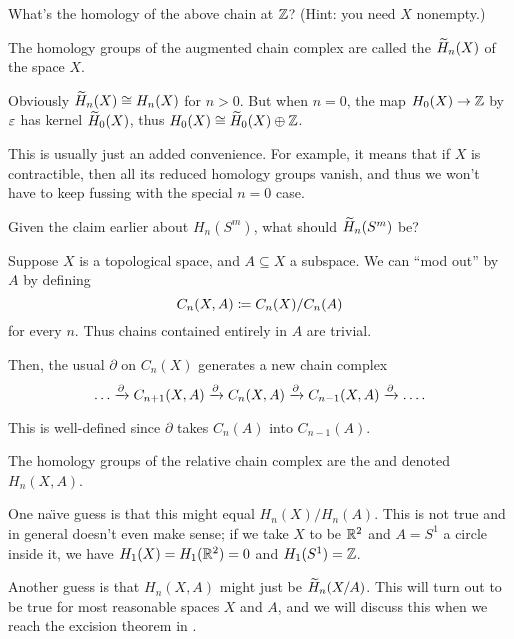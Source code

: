 \begin{ques}
	What's the homology of the above chain at $\mathbb Z$?
	(Hint: you need $X$ nonempty.)
\end{ques}
\begin{definition}
	\label{def:augment}
	The homology groups of the augmented chain complex are called the
	 $\widetilde H_n(X)$ of the space $X$.

	Obviously $\widetilde H_n(X) \cong H_n(X)$ for $n > 0$.
	But when $n=0$, the map $H_0(X) \to \mathbb Z$ by $\varepsilon$ has kernel $\widetilde H_0(X)$,
	thus $H_0(X) \cong \widetilde H_0(X) \oplus \mathbb Z$.
\end{definition}
This is usually just an added convenience.
For example, it means that if $X$ is contractible,
then all its reduced homology groups vanish,
and thus we won't have to keep fussing with the special $n=0$ case.
\begin{ques}
	Given the claim earlier about $H_n(S^m)$, what should $\widetilde H_n(S^m)$ be?
\end{ques}

\begin{example}
	Suppose $X$ is a topological space, and $A \subseteq X$ a subspace.
	We can ``mod out'' by $A$ by defining
	\[ C_n(X,A) \coloneqq C_n(X) / C_n(A) \]
	for every $n$. Thus chains contained entirely in $A$ are trivial.

	Then, the usual $\partial$ on $C_n(X)$ generates a new chain complex
	\[ \dots \xrightarrow{\partial} C_{n+1}(X,A) \xrightarrow{\partial} C_n(X,A)
	\xrightarrow{\partial} C_{n-1}(X,A) \xrightarrow{\partial} \dots. \]

	This is well-defined since $\partial$ takes $C_n(A)$ into $C_{n-1}(A)$.
\end{example}
\begin{definition}
	The homology groups of the relative chain complex are the
	 and denoted $H_n(X,A)$.
\end{definition}

One na\"{\i}ve guess is that this might equal $H_n(X) / H_n(A)$.
This is not true and in general doesn't even make sense;
if we take $X$ to be $\mathbb R^2$ and $A = S^1$ a circle inside it,
we have $H_1(X) = H_1(\mathbb R^2) = 0$ and $H_1(S^1) = \mathbb Z$.

Another guess is that $H_n(X,A)$ might just be $\widetilde H_n(X/A)$.
This will turn out to be true for most reasonable spaces $X$ and $A$,
and we will discuss this when we reach the excision theorem in .

